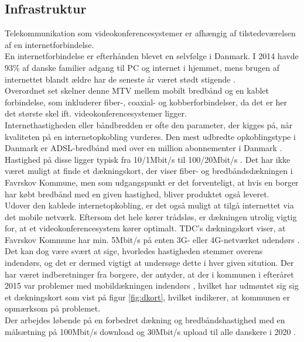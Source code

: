 \subsection{Infrastruktur}
Telekommunikation som videokonferencesystemer er afhængig af tilstedeværelsen af en  internetforbindelse.\\
En internetforbindelse er efterhånden blevet en selvfølge i Danmark. I 2014 havde 93\% af danske familier adgang til PC og internet i hjemmet, mens brugen af internettet blandt ældre har de seneste år været stødt stigende \cite{itanvendelse2014}.
\\Overordnet set skelner denne MTV mellem mobilt bredbånd og en kablet forbindelse, som inkluderer fiber-, coaxial- og kobberforbindelser, da det er her det største skel ift. videokonferencesystemer ligger.\\
Internethastigheden eller båndbredden er ofte den parameter, der kigges på, når kvaliteten på en internetopkobling vurderes. Den mest udbredte opkoblingstype i Danmark er ADSL-bredbånd med over en million abonnementer i Danmark \parencite{statadsl}. Hastighed på disse ligger typisk fra 10/1Mbit/s til 100/20Mbit/s \parencite{tdchastigheder} \parencite{telenorhastigheder}. Det har ikke været muligt at finde et dækningskort, der viser fiber- og bredbåndsdækningen i Favrskov Kommune, men som udgangspunkt er det forventeligt, at hvis en borger har købt bredbånd med en given hastighed, bliver produktet også leveret.\\
Udover den kablede internetopkobling, er det også muligt at tilgå internettet via det mobile netværk. Eftersom det hele kører trådsløs, er dækningen utrolig vigtig for, at et videokonferencesystem kører optimalt. TDC's dækningskort viser, at Favrskov Kommune har min. 5Mbit/s på enten 3G- eller 4G-netværket udendørs \parencite{tdcdaekning}. Det kan dog være svært at sige, hvorledes hastigheden stemmer overens indendørs, og det er dermed vigtigt at undersøge dette i hver given sitution. Der har været indberetninger fra borgere, der antyder, at der i kommunen i efteråret 2015 var problemer med mobildækningen indendørs \parencite{tv2oj_daekning}, hvilket har udmøntet sig sig et dækningskort som vist på figur \ref{fig:dkort}, hvilket indikerer, at kommunen er opmærksom på problemet.\\
Der arbejdes løbende på en forbedret dækning og bredbåndshastighed med en målsætning på 100Mbit/s download og 30Mbit/s upload til alle danskere i 2020 \parencite{digitalvel}.
